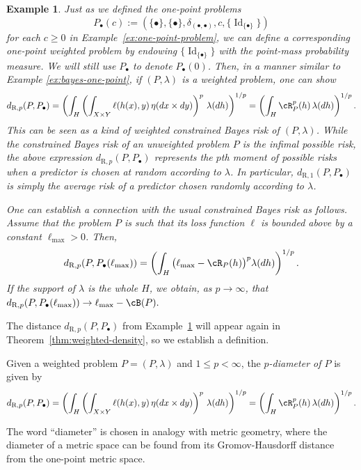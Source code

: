 \documentclass[twoside,11pt]{article}
\newtheorem{examples}[theorem]{Example}
\DeclareMathOperator{\id}{Id}
\newcommand{\dexp}[1][]{d_{\mathrm{R}#1}}
\begin{document}
\begin{examples}\label{ex:one-point-weighted-problem}
    Just as we defined the one-point problems
    \[P_\bullet(c) := (\{\bullet\},\{\bullet\}, \delta_{(\bullet,\bullet)}, c, \{\id_{\{\bullet\}}\})\]
    for each $c\geq 0$ in Example~\ref{ex:one-point-problem}, we can define a corresponding \emph{one-point weighted problem} by endowing $\{\id_{\{\bullet\}}\}$ with the point-mass probability measure. We will still use $P_\bullet$ to denote $P_\bullet(0)$. Then, in a manner similar to Example \ref{ex:bayes-one-point}, if $(P,\lambda)$ is a weighted problem, one can show
    \begin{align*}
        \dexp[,p](P,P_\bullet) = \left(\int_H\left(\int_{X\times Y}\ell(h(x),y)\,\eta(dx\times dy)\right)^p \, \lambda(dh)\right)^{1/p} = \left(\int_H \cR_P^p(h) \, \lambda(dh)\right)^{1/p}.
    \end{align*}
    This can be seen as a kind of weighted constrained Bayes risk of $(P,\lambda)$. While the constrained Bayes risk of an unweighted problem $P$ is the infimal possible risk, the above expression $\dexp[,p](P,P_\bullet)$ represents the $p$th moment of possible risks when a predictor is chosen at random according to $\lambda$. In particular, $\dexp[,1](P,P_\bullet)$ is simply the average risk of a predictor chosen randomly according to $\lambda$. 

    One can establish a connection with the usual constrained Bayes risk as follows. Assume that the problem $P$ is such that its loss function $\ell$ is bounded above by a constant $\ell_{\max}>0 $. Then, $$\dexp[,p](P,P_\bullet(\ell_{\max}))=\left(\int_H \big(\ell_{\max}-\cR_P(h)\big)^p\lambda(dh)\right)^{1/p}.$$ If the support of $\lambda$ is the whole $H$, we obtain, as $p\to\infty$, that $\dexp[,p](P,P_\bullet(\ell_{\max}))\to \ell_{\max}-\cB(P).$ 
\end{examples}

The distance $\dexp[,p](P,P_\bullet)$ from Example~\ref{ex:one-point-weighted-problem} will appear again in Theorem~\ref{thm:weighted-density}, so we establish a definition.
\begin{definition}
    Given a weighted problem $P = (P,\lambda)$ and $1\leq p <\infty$, the \emph{$p$-diameter of $P$} is given by
    \[\dexp[,p](P,P_\bullet) = \left(\int_H\left(\int_{X\times Y}\ell(h(x),y)\,\eta(dx\times dy)\right)^p \, \lambda(dh)\right)^{1/p} = \left(\int_H \cR_P^p(h) \, \lambda(dh)\right)^{1/p}.\]
\end{definition}
The word ``diameter'' is chosen in analogy with metric geometry, where the diameter of a metric space can be found from its Gromov-Hausdorff distance from the one-point metric space.
\end{document}
